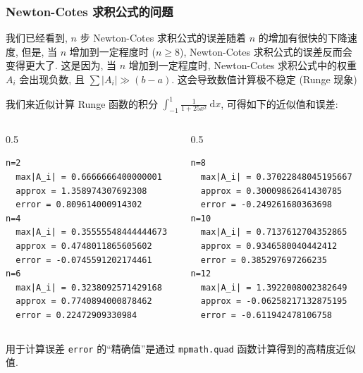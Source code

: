 \begin{frame}[fragile]
\frametitle{Newton-Cotes 求积公式的问题}

我们已经看到, $n$ 步 Newton-Cotes 求积公式的误差随着 $n$ 的增加有很快的下降速度, 但是, 当 $n$ 增加到一定程度时 ($n \geqslant 8$), Newton-Cotes 求积公式的误差反而会变得更大了. 这是因为, 当 $n$ 增加到一定程度时, Newton-Cotes 求积公式中的权重 $A_i$ 会出现负数, 且 $\sum |A_i| \gg (b-a)$. 这会导致数值计算极不稳定 (Runge 现象)

\pause

我们来近似计算 Runge 函数的积分 $\int_{-1}^1 \frac{1}{1+ 25x^2} ~ \mathrm{d}x$, 可得如下的近似值和误差:

\begin{columns}
\begin{column}{0.5\textwidth}
\begin{lstlisting}[numbers=none,keywordstyle=\color{black}]
n=2
  max|A_i| = 0.6666666400000001
  approx = 1.358974307692308
  error = 0.809614000914302
n=4
  max|A_i| = 0.35555548444444673
  approx = 0.4748011865605602
  error = -0.0745591202174461
n=6
  max|A_i| = 0.3238092571429168
  approx = 0.7740894000878462
  error = 0.22472909330984
\end{lstlisting}
\end{column}
\begin{column}{0.5\textwidth}
\begin{lstlisting}[numbers=none,keywordstyle=\color{black}]
n=8
  max|A_i| = 0.37022848045195667
  approx = 0.30009862641430785
  error = -0.249261680363698
n=10
  max|A_i| = 0.7137612704352865
  approx = 0.9346580040442412
  error = 0.385297697266235
n=12
  max|A_i| = 1.3922008002382649
  approx = -0.06258217132875195
  error = -0.611942478106758
\end{lstlisting}
\end{column}
\end{columns}
用于计算误差 \verb|error| 的``精确值''是通过 \verb|mpmath.quad| 函数计算得到的高精度近似值.

\end{frame}


